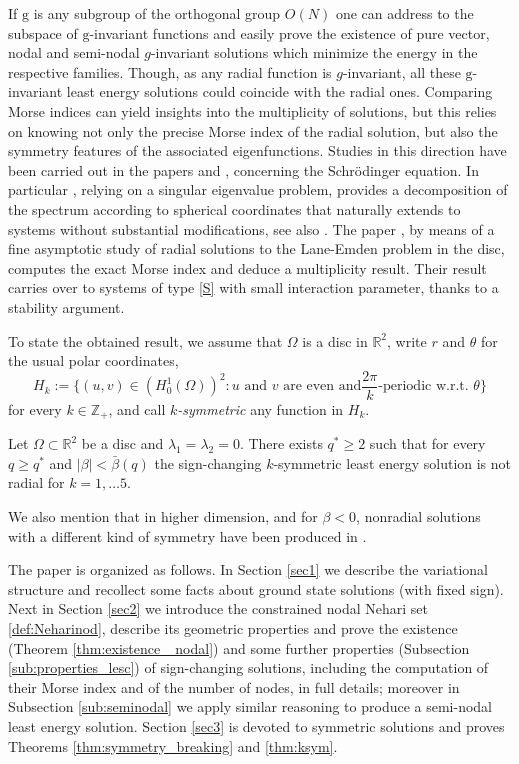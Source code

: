 \documentclass[reqno]{amsart}
\begin{document}
If ${\mathrm g}$ is any subgroup of the orthogonal group $O(N)$ one can address to the
subspace of $\mathrm g$-invariant functions
and easily prove the existence of pure vector, nodal and semi-nodal $g$-invariant
solutions which minimize the energy in the respective families.
Though, as any radial function is $g$-invariant, all these $\mathrm g$-invariant
least energy solutions could coincide with the radial ones.
Comparing Morse indices can yield insights into the multiplicity of solutions,
but this relies on knowing not only the precise Morse index of the radial solution,
but also the symmetry features of the associated eigenfunctions.
Studies in this direction have been carried out in the papers \cite{AmaGla20NARWA}
and \cite{GlaIan23Nodea}, concerning the Schr\"odinger equation.
In particular \cite{AmaGla20NARWA}, relying on a singular eigenvalue problem,
provides a decomposition of the spectrum according to spherical coordinates that
naturally extends to systems without substantial modifications,
see also \cite{Ama24JEPE}.
The paper \cite{GlaIan23Nodea}, by means of a fine asymptotic study of radial
solutions to the Lane-Emden problem in the disc, computes the exact Morse index and
deduce a multiplicity result.
Their result  carries over to systems of type \eqref{S} with small interaction
parameter, thanks to a stability argument.

To state the obtained result, we assume that $\Omega$ is a disc in $\mathbb{R}^2$,
write $r$ and $\theta$ for the usual polar coordinates,
\[
H_{k}:=\big\{(u,v)\in \left(H^1_0(\Omega)\right)^2  : \text{$u$ and $v$ are even and
$\frac{2\pi}{k}$-periodic w.r.t. $\theta$} \big\}
\]
for every $k\in \mathbb Z_+$, and call \emph{$k$-symmetric} any function in $H_k$.

\begin{theorem}\label{thm:ksym}
Let $\Omega\subset \mathbb{R}^2$ be a disc and $\lambda_1=\lambda_2=0$. There exists
$q^*\ge 2$ such that for every $q\ge q^*$ and $|\beta|< \bar\beta(q)$ the sign-changing
$k$-symmetric least energy solution is not radial for $k=1,\dots 5$.
\end{theorem}

We also mention that in higher dimension, and for $\beta<0$, nonradial solutions
with a different kind of symmetry have been produced in \cite{CS_CCM23}.

The paper is organized as follows. In Section \ref{sec1} we describe the variational
structure and recollect some facts about ground state solutions (with fixed sign).
Next in Section \ref{sec2} we introduce the constrained nodal Nehari set
\eqref{def:Neharinod}, describe its geometric properties and prove the existence
(Theorem \ref{thm:existence_ nodal}) and some further properties
(Subsection \ref{sub:properties_lesc}) of sign-changing solutions, including the
computation of their Morse index and of the number of nodes, in full details;
moreover in Subsection \ref{sub:seminodal} we apply similar reasoning to produce a
semi-nodal least energy solution.
Section \ref{sec3} is devoted to symmetric solutions and proves Theorems
\ref{thm:symmetry_breaking} and \ref{thm:ksym}.
\end{document}
